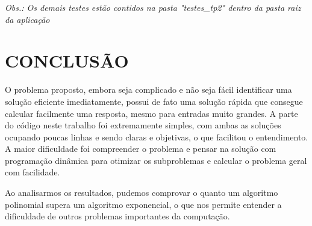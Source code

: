 \documentclass[12pt]{article}
\begin{document}
        \textit{Obs.: Os demais testes estão contidos na pasta "testes\_tp2" dentro da pasta raiz da aplicação}
    \newpage
    \section{CONCLUSÃO}
        O problema proposto, embora seja complicado e não seja fácil identificar uma solução eficiente imediatamente, 
        possui de fato uma solução rápida que consegue calcular facilmente uma resposta, mesmo para entradas muito 
        grandes. A parte do código neste trabalho foi extremamente simples, com ambas as soluções ocupando poucas 
        linhas e sendo claras e objetivas, o que facilitou o entendimento. A maior dificuldade foi compreender o 
        problema e pensar na solução com programação dinâmica para otimizar os subproblemas e calcular o problema 
        geral com facilidade.

        Ao analisarmos os resultados, pudemos comprovar o quanto um algoritmo polinomial supera um algoritmo 
        exponencial, o que nos permite entender a dificuldade de outros problemas importantes da computação.
	\newpage
    \nocite{Cormen2012}

\end{document}

